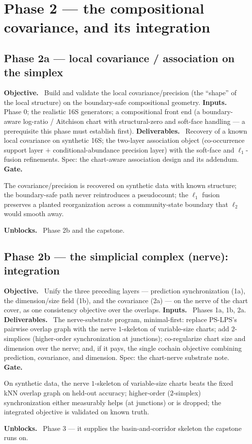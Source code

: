\documentclass[11pt]{article}
\newcommand{\field}[1]{\smallskip\noindent\textbf{\textsf{#1.}}\ }
\begin{document}
\section{Phase 2 --- the compositional covariance, and its integration}\label{sec:phase2}

\subsection{Phase 2a --- local covariance / association on the simplex}
\field{Objective} Build and validate the local covariance/precision (the
``shape'' of the local structure) on the boundary-safe compositional geometry.
\field{Inputs} Phase 0; the realistic 16S generators; a compositional front end
(a boundary-aware log-ratio / Aitchison chart with structural-zero and soft-face
handling --- a prerequisite this phase must establish first).
\field{Deliverables} Recovery of a known local covariance on synthetic 16S; the
two-layer association object (co-occurrence support layer $+$ conditional-abundance
precision layer) with the soft-face and $\ell_1$-fusion refinements. Spec: the
chart-aware association design and its addendum.
\field{Gate} \begin{gate} The covariance/precision is recovered on synthetic data
with known structure; the boundary-safe path never reintroduces a pseudocount; the
$\ell_1$ fusion preserves a planted reorganization across a community-state boundary
that $\ell_2$ would smooth away.\end{gate}
\field{Unblocks} Phase 2b and the capstone.

\subsection{Phase 2b --- the simplicial complex (nerve): integration}
\field{Objective} Unify the three preceding layers --- prediction synchronization
(1a), the dimension/size field (1b), and the covariance (2a) --- on the nerve of the
chart cover, as one consistency objective over the overlaps.
\field{Inputs} Phases 1a, 1b, 2a.
\field{Deliverables} The nerve-substrate program, minimal-first: replace PS-LPS's
pairwise overlap graph with the nerve $1$-skeleton of variable-size charts; add
$2$-simplices (higher-order synchronization at junctions); co-regularize chart size
and dimension over the nerve; and, if it pays, the single cochain objective
combining prediction, covariance, and dimension. Spec: the chart-nerve substrate
note.
\field{Gate} \begin{gate} On synthetic data, the nerve $1$-skeleton of variable-size
charts beats the fixed kNN overlap graph on held-out accuracy; higher-order
($2$-simplex) synchronization either measurably helps (at junctions) or is dropped;
the integrated objective is validated on known truth.\end{gate}
\field{Unblocks} Phase 3 --- it supplies the basin-and-corridor skeleton the
capstone runs on.
\end{document}
